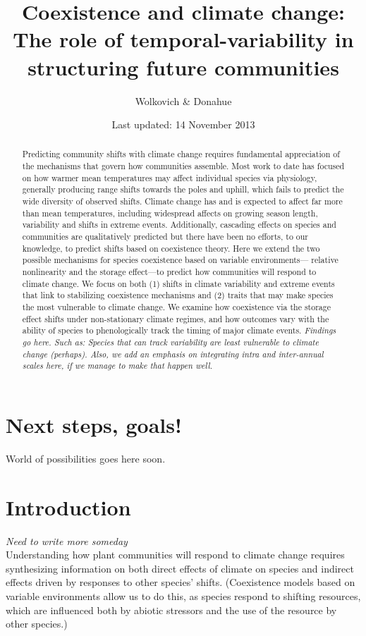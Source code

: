 \documentclass[11pt,a4paper,oneside]{article}
\begin{document}
\renewcommand{\labelitemi}{$ $}
\title{Coexistence and climate change: \\The role of
    temporal-variability in structuring future communities}
    \author{Wolkovich \& Donahue}
\date{Last updated: 14 November 2013}
\maketitle

\begin{abstract} Predicting community shifts
with climate change requires fundamental appreciation of the
mechanisms that govern how communities assemble. Most work to date has
focused on how warmer mean temperatures may affect individual species
via physiology, generally producing range shifts towards the poles and
uphill, which fails to predict the wide diversity of observed shifts.
Climate change has and is expected to affect far more than mean
temperatures, including widespread affects on growing season
length, variability and shifts in extreme events. Additionally,
cascading effects on species and communities are qualitatively
predicted but there have been no efforts, to our knowledge, to predict
shifts based on coexistence theory. Here we extend the two possible
mechanisms for species coexistence based on variable environments---
relative nonlinearity and the storage effect---to predict how
communities will respond to climate change. We focus on both (1) shifts in
climate variability and extreme events that link to
stabilizing coexistence mechanisms and (2) traits that may
make species the most vulnerable to climate change. We examine how
coexistence via the storage effect shifts under non-stationary climate regimes, and how outcomes vary with the
ability of species to phenologically track the timing of major climate events. \emph{Findings go here. Such as: Species that can track variability are least vulnerable to climate change (perhaps).  Also, we add an emphasis on integrating intra and inter-annual scales here, if we manage to make that happen well.}
\end{abstract}

\newpage




\section{Next steps, goals!}
\noindent World of possibilities goes here soon.

\section{Introduction}
\noindent \emph{Need to write more someday} \\
\noindent Understanding how plant communities will respond to climate change
requires synthesizing information on both direct effects of climate on species
and indirect effects driven by responses to other species'
shifts. (Coexistence models based on variable environments allow us to
do this, as species respond to shifting resources, which are
influenced both by abiotic stressors and the use of the resource by
other species.)
\end{document}
